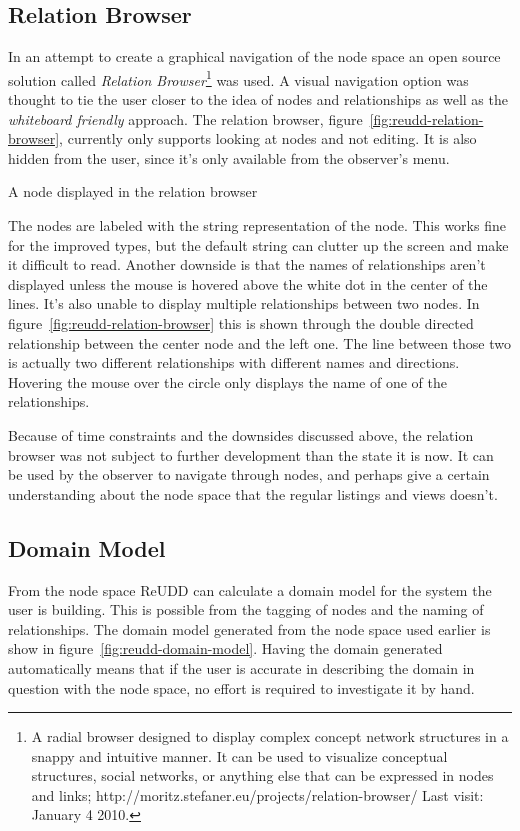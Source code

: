 \documentclass[a4paper]{report}
\begin{document}
\subsection{Relation Browser}
In an attempt to create a graphical navigation of the node space an open source solution called \emph{Relation Browser}\footnote{A radial browser designed to display complex concept network structures in a snappy and intuitive manner. It can be used to visualize conceptual structures, social networks, or anything else that can be expressed in nodes and links; http://moritz.stefaner.eu/projects/relation-browser/ Last visit: January 4 2010.} was used. A visual navigation option was thought to tie the user closer to the idea of nodes and relationships as well as the \emph{whiteboard friendly} approach. The relation browser, figure~\ref{fig:reudd-relation-browser}, currently only supports looking at nodes and not editing. It is also hidden from the user, since it's only available from the observer's menu.

	{A node displayed in the relation browser}

The nodes are labeled with the string representation of the node. This works fine for the improved types, but the default string can clutter up the screen and make it difficult to read. Another downside is that the names of relationships aren't displayed unless the mouse is hovered above the white dot in the center of the lines. It's also unable to display multiple relationships between two nodes. In figure~\ref{fig:reudd-relation-browser} this is shown through the double directed relationship between the center node and the left one. The line between those two is actually two different relationships with different names and directions. Hovering the mouse over the circle only displays the name of one of the relationships.

Because of time constraints and the downsides discussed above, the relation browser was not subject to further development than the state it is now. It can be used by the observer to navigate through nodes, and perhaps give a certain understanding about the node space that the regular listings and views doesn't.

\subsection{Domain Model}
From the node space ReUDD can calculate a domain model for the system the user is building. This is possible from the tagging of nodes and the naming of relationships. The domain model generated from the node space used earlier is show in figure~\ref{fig:reudd-domain-model}. Having the domain generated automatically means that if the user is accurate in describing the domain in question with the node space, no effort is required to investigate it by hand.
\end{document}
